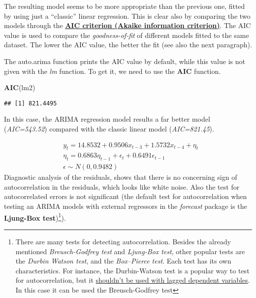 \documentclass[
]{article}
\newenvironment{Shaded}{\begin{snugshade}}{\end{snugshade}}
\newcommand{\FunctionTok}[1]{\textcolor[rgb]{0.13,0.29,0.53}{\textbf{#1}}}
\newcommand{\NormalTok}[1]{#1}
\begin{document}
The resulting model seems to be more appropriate than the previous one, fitted by using just a ``classic'' linear regression. This is clear also by comparing the two models through the \href{https://en.wikipedia.org/wiki/Akaike_information_criterion}{\textbf{AIC criterion (Akaike information criterion)}}. The AIC value is used to compare the \emph{goodness-of-fit} of different models fitted to the same dataset. The lower the AIC value, the better the fit (see also the next paragraph).

The auto.arima function prints the AIC value by default, while this value is not given with the \emph{lm} function. To get it, we need to use the \textbf{AIC} function.

\begin{Shaded}
\begin{Highlighting}[]
\FunctionTok{AIC}\NormalTok{(lm2)}
\end{Highlighting}
\end{Shaded}

\begin{verbatim}
## [1] 821.4495
\end{verbatim}

In this case, the ARIMA regression model results a far better model (\emph{AIC=543.52}) compared with the classic linear model (\emph{AIC=821.45}).

\[
\begin{aligned} 
& y_t = 14.8532 + 0.9506x_{t-3} + 1.5732x_{t-4} + \eta_t \\
& \eta_t = 0.6863\eta_{t-1} + \epsilon_t + 0.6491\epsilon_{t-1} \\
& \epsilon \sim N(0, 0.9482)
\end{aligned} 
\]
Diagnostic analysis of the residuals, shows that there is no concerning sign of autocorrelation in the residuals, which looks like white noise. Also the test for autocorrelated errors is not significant (the default test for autocorrelation when testing an ARIMA models with external regressors in the \emph{forecast} package is the \textbf{Ljung-Box test})\footnote{There are many tests for detecting autocorrelation. Besides the already mentioned \emph{Breusch-Godfrey test} and \emph{Ljung-Box test}, other popular tests are the \emph{Durbin Watson test}, and the \emph{Box--Pierce test}. Each test has its own characteristics. For instance, the Durbin-Watson test is a popular way to test for autocorrelation, but it \href{https://www.jstor.org/stable/pdf/1909870.pdf?refreqid=excelsior\%3A9526730d9debe4fa8f1a4d5fa601d523}{shouldn't be used with lagged dependent variables}. In this case it can be used the Breusch-Godfrey test}).
\end{document}
